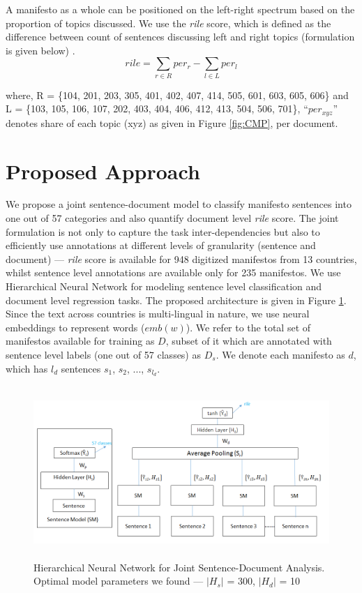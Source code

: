 \documentclass[11pt,a4paper]{article}
\newcommand{\norm}[1]{\vert #1 \vert}
\begin{document}
A manifesto as a whole can be positioned on the left-right spectrum based on the proportion of topics discussed. We use the \textit{rile} score, which is defined as the difference between count of sentences discussing left and right topics (formulation is given below) \cite{cat}. 
\begin{equation}
rile = \sum_{r \in R} per_{r} - \sum_{l \in L} per_{l}
\end{equation}

where, R = \{104, 201, 203, 305, 401, 402, 407, 414, 505, 601, 603, 605, 606\} and L = \{103, 105, 106, 107, 202, 403, 404, 406, 412, 413, 504, 506, 701\}, ``$per_{xyz}$'' denotes share of each topic (xyz) as given in Figure \ref{fig:CMP}, per document.  

\section{Proposed Approach}
We propose a joint sentence-document model to classify manifesto sentences into one out of 57 categories and also quantify document level \textit{rile} score. The joint formulation is not only to capture the task inter-dependencies but also to efficiently use annotations at different levels of granularity (sentence and document) --- \textit{rile} score is available for 948 digitized manifestos from 13 countries, whilst sentence level annotations are available only for 235 manifestos. We use Hierarchical Neural Network for modeling sentence level classification and document level regression tasks. The proposed architecture is given in Figure \ref{fig:HNN}. Since the text across countries is multi-lingual in nature, we use neural embeddings to represent words ($emb(w)$). We refer to the total set of manifestos available for training as $D$, subset of it which are annotated with sentence level labels (one out of 57 classes) as $D_{s}$. We denote each manifesto as $d$, which has $l_{d}$ sentences $s_{1}$, $s_{2}$, ..., $s_{l_{d}}$. 


\begin{figure}[!ht]
\centering
\includegraphics[height=6.5cm, scale=0.8]{JointModel11.png}
\caption{Hierarchical Neural Network for Joint Sentence-Document Analysis. Optimal model parameters we found --- $\norm{H_{s}}$ = 300, $\norm{H_{d}}$ = 10}
 \label{fig:HNN}
 \end{figure}
\end{document}
